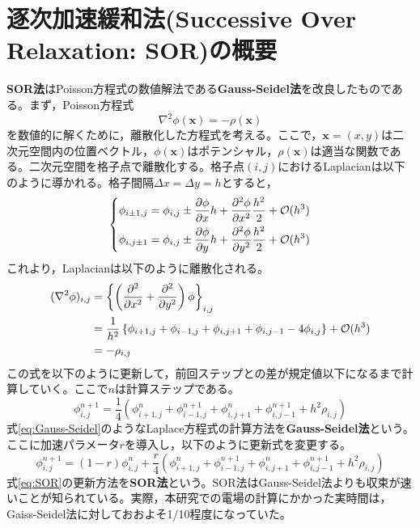 \documentclass[autodetect-engine,dvi=dvipdfmx,a4paper,ja=standard,oneside,openany,11pt,draft]{bxjsbook}
\begin{document}
\chapter{逐次加速緩和法(Successive Over Relaxation: SOR)の概要}
\label{sec:SOR}
\textbf{SOR法}はPoisson方程式の数値解法である\textbf{Gauss-Seidel法}を改良したものである。まず，Poisson方程式
\begin{equation}
  \nabla^2\phi(\bm{x})=-\rho(\bm{x})
  \label{eq:poisson}
\end{equation}
を数値的に解くために，離散化した方程式を考える。ここで，$\bm{x}=(x,y)$は二次元空間内の位置ベクトル，$\phi(\bm{x})$はポテンシャル，$\rho(\bm{x})$は適当な関数である。二次元空間を格子点で離散化する。格子点$(i,j)$におけるLaplacianは以下のように導かれる。格子間隔$\Delta x=\Delta y=h$とすると，
\begin{equation}
  \left\{
  \begin{aligned}
    \phi_{i\pm1,j} & =\phi_{i,j}\pm \pdv{\phi}{x}h+\pdv[2]{\phi}{x}\frac{h^2}{2}+\mathcal{O}(h^3) \\
    \phi_{i,j\pm1} & =\phi_{i,j}\pm \pdv{\phi}{y}h+\pdv[2]{\phi}{y}\frac{h^2}{2}+\mathcal{O}(h^3)
  \end{aligned}
  \right.
  \label{eq:discrete_laplasian}
\end{equation}
これより，Laplacianは以下のように離散化される。
\begin{equation}
  \begin{split}
    (\nabla^2\phi)_{i,j} & =\left\{\left(\pdv*[2]{}{x}+\pdv*[2]{}{y}\right)\phi\right\}_{i,j}                                            \\
                         & =\frac{1}{h^2}\left\{\phi_{i+1,j}+\phi_{i-1,j}+\phi_{i,j+1}+\phi_{i,j-1}-4\phi_{i,j}\right\}+\mathcal{O}(h^3) \\
                         & =-\rho_{i,j}
  \end{split}
  \label{eq:discrete_poisson}
\end{equation}
この式を以下のように更新して，前回ステップとの差が規定値以下になるまで計算していく。ここで$n$は計算ステップである。
\begin{equation}
  \phi_{i,j}^{n+1}=\frac{1}{4}\left(\phi_{i+1,j}^{n}+\phi_{i-1,j}^{n+1}+\phi_{i,j+1}^{n}+\phi_{i,j-1}^{n+1}+h^2\rho_{i,j}\right)
  \label{eq:Gauss-Seidel}
\end{equation}
式\ref{eq:Gauss-Seidel}のようなLaplace方程式の計算方法を\textbf{Gauss-Seidel法}という。ここに加速パラメータ$r$を導入し，以下のように更新式を変更する。
\begin{equation}
  \phi_{i,j}^{n+1}=(1-r)\phi_{i,j}^{n}+\frac{r}{4}\left(\phi_{i+1,j}^{n}+\phi_{i-1,j}^{n+1}+\phi_{i,j+1}^{n}+\phi_{i,j-1}^{n+1}+h^2\rho_{i,j}\right)
  \label{eq:SOR}
\end{equation}
式\ref{eq:SOR}の更新方法を\textbf{SOR法}という。SOR法はGauss-Seidel法よりも収束が速いことが知られている。実際，本研究での電場の計算にかかった実時間は，Gaiss-Seidel法に対しておおよそ1/10程度になっていた。
\end{document}
